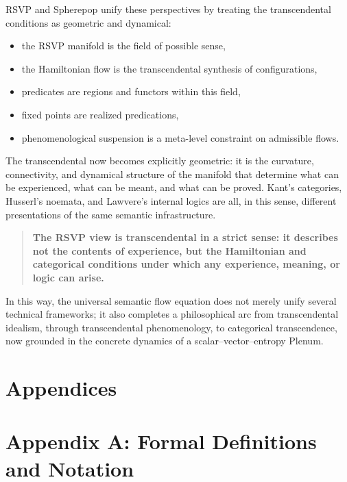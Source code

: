 \documentclass[12pt,letterpaper]{article}
\begin{document}
RSVP and Spherepop unify these perspectives by treating the transcendental
conditions as geometric and dynamical:

\begin{itemize}
    \item the RSVP manifold is the field of possible sense,
    \item the Hamiltonian flow is the transcendental synthesis of configurations,
    \item predicates are regions and functors within this field,
    \item fixed points are realized predications,
    \item phenomenological suspension is a meta-level constraint on admissible flows.
\end{itemize}

The transcendental now becomes explicitly geometric: it is the curvature,
connectivity, and dynamical structure of the manifold that determine what can be
experienced, what can be meant, and what can be proved.  Kant’s categories,
Husserl’s noemata, and Lawvere’s internal logics are all, in this sense,
different presentations of the same semantic infrastructure.

\begin{quote}
\textbf{The RSVP view is transcendental in a strict sense: it describes not the
contents of experience, but the Hamiltonian and categorical conditions under
which any experience, meaning, or logic can arise.}
\end{quote}

In this way, the universal semantic flow equation does not merely unify several
technical frameworks; it also completes a philosophical arc from transcendental
idealism, through transcendental phenomenology, to categorical transcendence,
now grounded in the concrete dynamics of a scalar--vector--entropy Plenum.



\appendix
\section*{Appendices}


\section{Appendix A: Formal Definitions and Notation}
\end{document}
